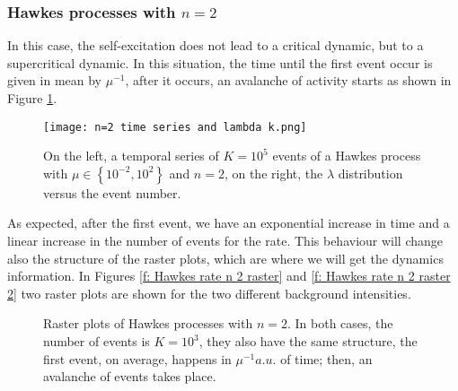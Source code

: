 \subsubsection{Hawkes processes with $n=2$} \label{subsubsec:Hawkes_processes_n_2}

In this case, the self-excitation does not lead to a critical dynamic, but to a supercritical dynamic. In this situation, the time until the first event occur is given in mean by $\mu^{-1}$,
after it occurs, an avalanche of activity starts as shown in Figure \ref{f: Hawkes rate n 2}.

\begin{figure}[H]
    \centering
    \texttt{[image: n=2 time series and lambda k.png]}
    \caption{On the left, a temporal series of $K=10^5$ events of a Hawkes process with $\mu\in \left\{ 10^{-2},10^{2}\right\}$ and $n=2$, on the right, the $\lambda$ distribution versus 
    the event number.}
    \label{f: Hawkes rate n 2}
\end{figure}

As expected, after the first event, we have an exponential increase in time and a linear increase in the number of events for the rate. This behaviour will change also the structure of the 
raster plots, which are where we will get the dynamics information. In Figures \ref{f: Hawkes rate n 2 raster} and \ref{f: Hawkes rate n 2 raster 2} two raster plots are shown for the
two different background intensities.

\begin{figure}[H]
    \subfigure[Background rate $\mu=10^{-4}$.]{
        \texttt{[image: raster n=2 mu=10-4.png]}
        \label{f: Hawkes rate n 2 raster}
    }
    \subfigure[Background rate $\mu=10^{2}$.]{
        \texttt{[image: raster n=2 mu=10+2.png]}
     \label{f: Hawkes rate n 2 raster 2}    
    }
    \caption{Raster plots of Hawkes processes with $n=2$. In both cases, the number of events is $K=10^3$, they also have the same structure, the first event, on average,
    happens in $\mu^{-1}a.u.$ of time; then, an avalanche of events takes place.}
    \label{f: Hawkes rate n 2 rasters}
\end{figure}

